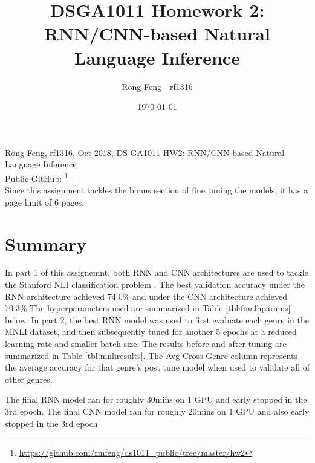 \documentclass[a4paper,10pt]{article}
\title{DSGA1011 Homework 2: RNN/CNN-based Natural Language Inference}
\author{Rong Feng - rf1316}
\date{\printdayoff\today}
\begin{document}
Rong Feng, rf1316, Oct 2018, DS-GA1011 HW2: RNN/CNN-based Natural Language Inference \\ 
Public GitHub: \footnote{\url{https://github.com/rmfeng/ds1011_public/tree/master/hw2}}\\
Since this assignment tackles the bonus section of fine tuning the models, it has a page limit of 6 pages.

\section{Summary}
\par 
\justify
In part 1 of this assignemnt, both RNN and CNN architectures are used to tackle the Stanford NLI classification problem \cite{nlistanford}. The best validation accuracy under the RNN architecture achieved 74.0\% and under the CNN architecture achieved 70.3\% The hyperparameters used are summarized in Table \ref{tbl:finalhparams} below. In part 2, the best RNN model was used to first evaluate each genre in the MNLI dataset, and then subsequently tuned for another 5 epochs at a reduced learning rate and smaller batch size. The results before and after tuning are summarized in Table \ref{tbl:mnliresults}. The Avg Cross Genre column represents the average accuracy for that genre's post tune model when used to validate all of other genres.

\par
\justify
The final RNN model ran for roughly 30mins on 1 GPU and early stopped in the 3rd epoch. The final CNN model ran for roughly 20mins on 1 GPU and also early stopped in the 3rd epoch
\end{document}
